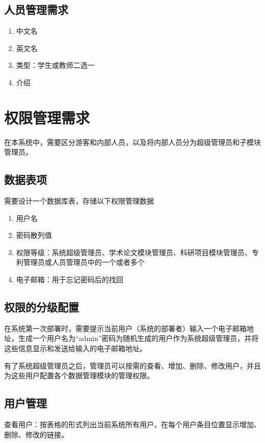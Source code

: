\subsection{人员管理需求}

\begin{enumerate}
\item 中文名
\item 英文名
\item 类型：学生或教师二选一
\item 介绍
\end{enumerate}

\section{权限管理需求}

在本系统中，需要区分游客和内部人员，以及将内部人员分为超级管理员和子模块管理员。

\subsection{数据表项}
需要设计一个数据库表，存储以下权限管理数据

\begin{enumerate}
\item 用户名
\item 密码散列值
\item 权限等级：系统超级管理员、学术论文模块管理员、科研项目模块管理员、专利管理员或人员管理员中的一个或者多个
\item 电子邮箱：用于忘记密码后的找回
\end{enumerate}

\subsection{权限的分级配置}

在系统第一次部署时，需要提示当前用户（系统的部署者）输入一个电子邮箱地址，生成一个用户名为“admin”密码为随机生成的用户作为系统超级管理员，并将这些信息显示和发送给输入的电子邮箱地址。

有了系统超级管理员之后，管理员可以按需的查看、增加、删除、修改用户，并且为这些用户配置各个数据管理模块的管理权限。

\subsection{用户管理}

查看用户：按表格的形式列出当前系统所有用户，在每个用户条目位置显示增加、删除、修改的链接。


